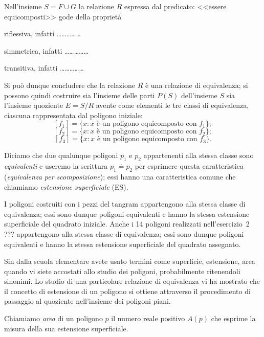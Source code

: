 Nell'insieme $S=F\cup G$ la relazione $R$ espressa dal predicato: <<essere equicomposti>> gode della proprietà
\begin{itemize*}
\item riflessiva, infatti \ldots\ldots\ldots\ldots\ldots{}
\item simmetrica, infatti \ldots\ldots\ldots\ldots\ldots{}
\item transitiva, infatti \ldots\ldots\ldots\ldots\ldots{}
\end{itemize*}

Si può dunque concludere che la relazione $R$ è una relazione di equivalenza; si possono quindi costruire sia l'insieme delle parti $P(S)$ dell'insieme $S$ sia l'insieme quoziente $E=S/R$ avente come elementi le tre classi di equivalenza, ciascuna rappresentata dal poligono iniziale:
\[ [f_1] = \{x:x\text{ è un poligono equicomposto con }f_1\}; \]
\[ [f_2] = \{x:x\text{ è un poligono equicomposto con }f_2\}; \]
\[ [f_3] = \{x:x\text{ è un poligono equicomposto con }f_3\}. \]

\begin{definizione}
Diciamo che due qualunque poligoni $p_1$ e $p_2$ appartenenti alla stessa classe sono \emph{equivalenti} e useremo la scrittura $p_1\doteq p_2$ per esprimere questa caratteristica (\emph{equivalenza per scomposizione}); essi hanno una caratteristica comune che chiamiamo \emph{estensione superficiale} (ES).
\end{definizione}

I poligoni costruiti con i pezzi del tangram appartengono alla stessa classe di equivalenza; essi sono dunque poligoni equivalenti e hanno la stessa estensione superficiale del quadrato iniziale.
Anche i 14 poligoni realizzati nell'esercizio~2 ??? appartengono alla stessa classe di equivalenza; essi sono dunque poligoni equivalenti e hanno la stessa estensione superficiale del quadrato assegnato.

\osservazione Sin dalla scuola elementare avete usato termini come superficie, estensione, area quando vi siete accostati allo studio dei poligoni, probabilmente ritenendoli sinonimi. Lo studio di una particolare relazione di equivalenza vi ha mostrato che il concetto di estensione di un poligono si ottiene attraverso il procedimento di passaggio al quoziente nell'insieme dei poligoni piani.

\begin{definizione}
Chiamiamo \emph{area} di un poligono $p$ il numero reale positivo $A(p)$ che esprime la misura della sua estensione superficiale.
\end{definizione}

